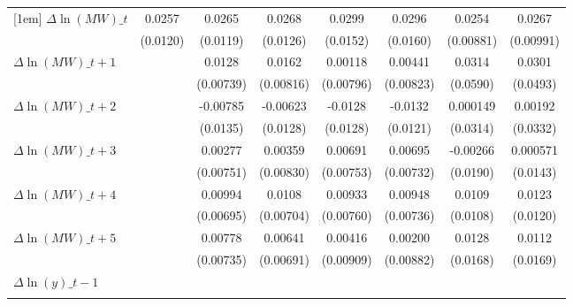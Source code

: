 {\begin{tabular}{l*{7}{c}}
[1em]
$\Delta \ln(MW)\_{t}$&   0.0257\sym{**} &   0.0265\sym{**} &   0.0268\sym{**} &   0.0299\sym{*}  &   0.0296\sym{*}  &   0.0254\sym{***}&   0.0267\sym{**} \\
          & (0.0120)         & (0.0119)         & (0.0126)         & (0.0152)         & (0.0160)         &(0.00881)         &(0.00991)         \\
[1em]
$\Delta \ln(MW)\_{t+1}$&                  &   0.0128\sym{*}  &   0.0162\sym{*}  &  0.00118         &  0.00441         &   0.0314         &   0.0301         \\
          &                  &(0.00739)         &(0.00816)         &(0.00796)         &(0.00823)         & (0.0590)         & (0.0493)         \\
[1em]
$\Delta \ln(MW)\_{t+2}$&                  & -0.00785         & -0.00623         &  -0.0128         &  -0.0132         & 0.000149         &  0.00192         \\
          &                  & (0.0135)         & (0.0128)         & (0.0128)         & (0.0121)         & (0.0314)         & (0.0332)         \\
[1em]
$\Delta \ln(MW)\_{t+3}$&                  &  0.00277         &  0.00359         &  0.00691         &  0.00695         & -0.00266         & 0.000571         \\
          &                  &(0.00751)         &(0.00830)         &(0.00753)         &(0.00732)         & (0.0190)         & (0.0143)         \\
[1em]
$\Delta \ln(MW)\_{t+4}$&                  &  0.00994         &   0.0108         &  0.00933         &  0.00948         &   0.0109         &   0.0123         \\
          &                  &(0.00695)         &(0.00704)         &(0.00760)         &(0.00736)         & (0.0108)         & (0.0120)         \\
[1em]
$\Delta \ln(MW)\_{t+5}$&                  &  0.00778         &  0.00641         &  0.00416         &  0.00200         &   0.0128         &   0.0112         \\
          &                  &(0.00735)         &(0.00691)         &(0.00909)         &(0.00882)         & (0.0168)         & (0.0169)         \\
[1em]
$\Delta \ln(y)\_{t-1}$&                  &                  &                  &                  &                  &                  &                  \\
          &                  &                  &                  &                  &                  &                  &                  \\

\end{tabular}}
